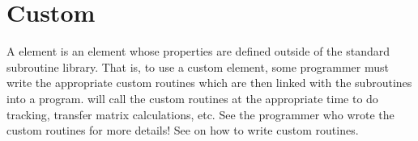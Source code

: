 %
%

\newpage

\section{Custom}
\label{s:custom}

A  element is an element whose properties are defined outside of the standard \bmad
subroutine library. That is, to use a custom element, some programmer must write the appropriate
custom routines which are then linked with the \bmad subroutines into a program. \bmad will call the
custom routines at the appropriate time to do tracking, transfer matrix calculations, etc. See the
programmer who wrote the custom routines for more details! See  on how to write
custom routines.

